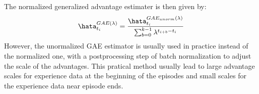 The normalized generalized advantage estimater is then given by:
\begin{align}
\hata_{t_i}^{GAE(\lambda)}
= \frac{\hata_{t_i}^{GAE_{unorm}(\lambda)}}{\sum_{b=0}^{k-1} \lambda^{t_{i+b}-t_i}}
\end{align}
However, the unormalized GAE estimator is usually used in practice instead of the normalized one, with a postprocessing step of batch normalization to adjust the scale of the advantages. This pratical method usually lead to large advantage scales for experience data at the beginning of the episodes and small scales for the experience data near episode ends.

